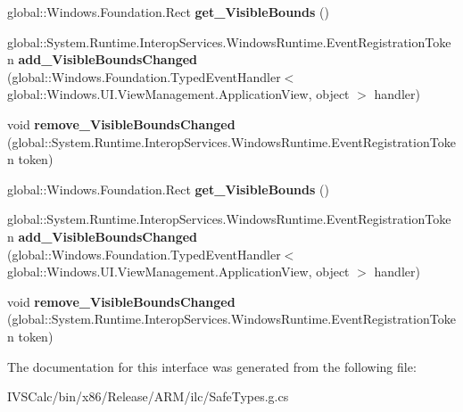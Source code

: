 \begin{DoxyCompactItemize}
global\+::\+Windows.\+Foundation.\+Rect {\bfseries get\+\_\+\+Visible\+Bounds} ()
\item 
\mbox{\label{interface_windows_1_1_u_i_1_1_view_management_1_1_i_application_view2_a6f3dd73ea0a85e796cca56ccc59508ec}} 
global\+::\+System.\+Runtime.\+Interop\+Services.\+Windows\+Runtime.\+Event\+Registration\+Token {\bfseries add\+\_\+\+Visible\+Bounds\+Changed} (global\+::\+Windows.\+Foundation.\+Typed\+Event\+Handler$<$ global\+::\+Windows.\+U\+I.\+View\+Management.\+Application\+View, object $>$ handler)
\item 
\mbox{\label{interface_windows_1_1_u_i_1_1_view_management_1_1_i_application_view2_a6edb35d942013a4377357cc35cbac9fe}} 
void {\bfseries remove\+\_\+\+Visible\+Bounds\+Changed} (global\+::\+System.\+Runtime.\+Interop\+Services.\+Windows\+Runtime.\+Event\+Registration\+Token token)
\item 
\mbox{\label{interface_windows_1_1_u_i_1_1_view_management_1_1_i_application_view2_ad6db037a99c4ceb8e22771d1d3805bba}} 
global\+::\+Windows.\+Foundation.\+Rect {\bfseries get\+\_\+\+Visible\+Bounds} ()
\item 
\mbox{\label{interface_windows_1_1_u_i_1_1_view_management_1_1_i_application_view2_a6f3dd73ea0a85e796cca56ccc59508ec}} 
global\+::\+System.\+Runtime.\+Interop\+Services.\+Windows\+Runtime.\+Event\+Registration\+Token {\bfseries add\+\_\+\+Visible\+Bounds\+Changed} (global\+::\+Windows.\+Foundation.\+Typed\+Event\+Handler$<$ global\+::\+Windows.\+U\+I.\+View\+Management.\+Application\+View, object $>$ handler)
\item 
\mbox{\label{interface_windows_1_1_u_i_1_1_view_management_1_1_i_application_view2_a6edb35d942013a4377357cc35cbac9fe}} 
void {\bfseries remove\+\_\+\+Visible\+Bounds\+Changed} (global\+::\+System.\+Runtime.\+Interop\+Services.\+Windows\+Runtime.\+Event\+Registration\+Token token)
\end{DoxyCompactItemize}


The documentation for this interface was generated from the following file\+:\begin{DoxyCompactItemize}
\item 
I\+V\+S\+Calc/bin/x86/\+Release/\+A\+R\+M/ilc/Safe\+Types.\+g.\+cs\end{DoxyCompactItemize}
